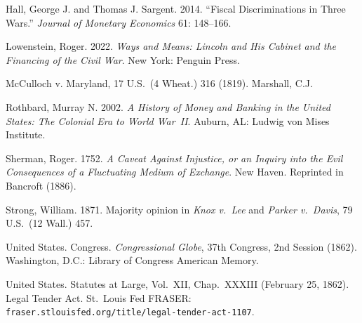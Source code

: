 \documentclass[12pt]{article}
\begin{document}
\begin{description}
\item Hall, George J. and Thomas J. Sargent. 2014. ``Fiscal
Discriminations in Three Wars.'' \textit{Journal of Monetary Economics}
61: 148--166.

\item Lowenstein, Roger. 2022. \textit{Ways and Means: Lincoln and His
Cabinet and the Financing of the Civil War}. New York: Penguin Press.

\item McCulloch v. Maryland, 17 U.S.\ (4 Wheat.) 316 (1819). Marshall,
C.J.

\item Rothbard, Murray N. 2002. \textit{A History of Money and Banking in
the United States: The Colonial Era to World War~II}. Auburn, AL: Ludwig
von Mises Institute.

\item Sherman, Roger. 1752. \textit{A Caveat Against Injustice, or an
Inquiry into the Evil Consequences of a Fluctuating Medium of Exchange}.
New Haven. Reprinted in Bancroft (1886).

\item Strong, William. 1871. Majority opinion in \textit{Knox v.\ Lee}
and \textit{Parker v.\ Davis}, 79 U.S.\ (12 Wall.) 457.

\item United States. Congress. \textit{Congressional Globe}, 37th
Congress, 2nd Session (1862). Washington, D.C.: Library of Congress
American Memory.

\item United States. Statutes at Large, Vol.\ XII, Chap.\ XXXIII
(February 25, 1862). Legal Tender Act. St.\ Louis Fed FRASER:
\texttt{fraser.stlouisfed.org/title/legal-tender-act-1107}.

\end{description}
\end{document}
